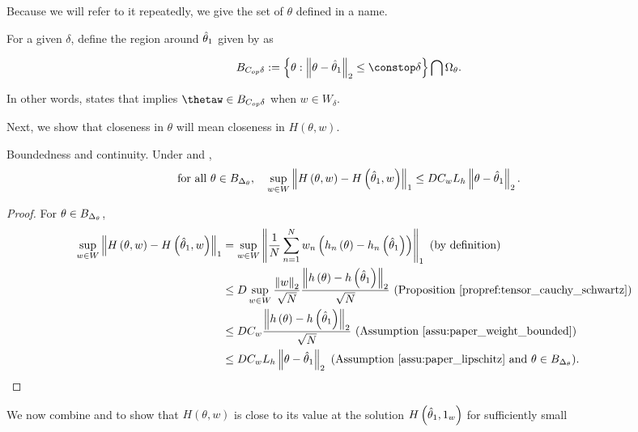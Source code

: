 %
Because we will refer to it repeatedly, we give the set of $\theta$
defined in  a name.
\begin{defn}
For a given $\delta$, define the region around $\hat{\theta}_{1}$ given
by  as

\begin{align*}
\thetadeltaball & :=\left\{ \theta:\norm{\theta-\thetaone}_{2}\le\constop\delta\right\} \bigcap\Omega_{\theta}.
\end{align*}
\end{defn}
%
In other words,  states that 
implies $\thetaw\in\thetadeltaball$ when $w\in W_{\delta}$.

Next, we show that closeness in $\theta$ will mean closeness in $H\left(\theta,w\right)$.
\begin{lem}
\label{lem:bounded_continuous} Boundedness and continuity. Under
\paperallcoreassum and ,
\begin{align*}
\textrm{for all }\theta\in B_{\Delta_{\theta}},\quad\sup_{w\in W}\left\Vert H\left(\theta,w\right)-H\left(\hat{\theta}_{1},w\right)\right\Vert_{1} & \le DC_{w}L_{h}\left\Vert \theta-\hat{\theta}_{1}\right\Vert_{2}.
\end{align*}
\end{lem}
\begin{proof}
For $\theta\in B_{\Delta_{\theta}}$,
\begin{align*}
\sup_{w\in W}\left\Vert H\left(\theta,w\right)-H\left(\hat{\theta}_{1},w\right)\right\Vert_{1} & =\sup_{w\in W}\left\Vert \frac{1}{N}\sum_{n=1}^{N}w_{n}\left(h_{n}\left(\theta\right)-h_{n}\left(\hat{\theta}_{1}\right)\right)\right\Vert_{1}\textrm{ (by definition)}\\
 & \le D\sup_{w\in W}\frac{\left\Vert w\right\Vert_{2}}{\sqrt{N}}\frac{\left\Vert h\left(\theta\right)-h\left(\hat{\theta}_{1}\right)\right\Vert_{2}}{\sqrt{N}}\textrm{ (Proposition \ref{propref:tensor_cauchy_schwartz})}\\
 & \le DC_{w}\frac{\left\Vert h\left(\theta\right)-h\left(\hat{\theta}_{1}\right)\right\Vert_{2}}{\sqrt{N}}\textrm{ (Assumption \ref{assu:paper_weight_bounded})}\\
 & \le DC_{w}L_{h}\left\Vert \theta-\hat{\theta}_{1}\right\Vert_{2}\textrm{ (Assumption \ref{assu:paper_lipschitz} and }\theta\in B_{\Delta_{\theta}}\textrm{)}.
\end{align*}
\end{proof}
%
We now combine  and 
to show that $H\left(\theta,w\right)$ is close to its value at the
solution $H\left(\hat{\theta}_{1},1_{w}\right)$ for sufficiently small
